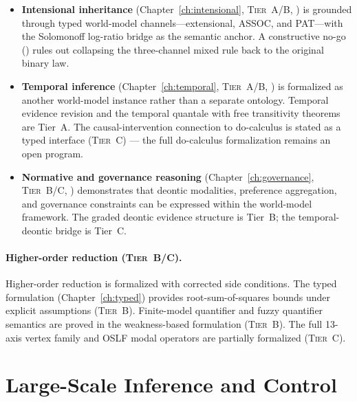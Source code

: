 \begin{itemize}
\item \textbf{Intensional inheritance}
  (Chapter~\ref{ch:intensional}, \textsc{Tier~A/B},
  \claimConditional{}) is grounded through typed
  world-model channels---extensional, ASSOC, and PAT---with the
  Solomonoff log-ratio bridge as the semantic anchor.  A constructive
  no-go (\claimBoundary{}) rules out collapsing the three-channel mixed
  rule back to the original binary law.

\item \textbf{Temporal inference}
  (Chapter~\ref{ch:temporal}, \textsc{Tier~A/B},
  \claimConditional{}) is formalized as another world-model instance
  rather than a separate ontology.  Temporal evidence revision and the
  temporal quantale with free transitivity theorems are Tier~A.  The
  causal-intervention connection to do-calculus is stated as a
  typed interface (\textsc{Tier~C}) --- the full do-calculus
  formalization remains an open program.

\item \textbf{Normative and governance reasoning}
  (Chapter~\ref{ch:governance}, \textsc{Tier~B/C},
  \claimConditional{}) demonstrates that deontic modalities,
  preference aggregation, and governance constraints can be expressed
  within the world-model framework.  The graded deontic evidence
  structure is Tier~B; the temporal-deontic bridge is Tier~C.
\end{itemize}

\paragraph{Higher-order reduction (\textsc{Tier~B/C}).}
Higher-order reduction is formalized with corrected side conditions.
The typed formulation (Chapter~\ref{ch:typed}) provides
root-sum-of-squares bounds under explicit assumptions (\textsc{Tier~B}).
Finite-model quantifier and fuzzy quantifier semantics are proved in the
weakness-based formulation (\textsc{Tier~B}).  The full 13-axis vertex
family and OSLF modal operators are partially formalized
(\textsc{Tier~C}).


\section{Large-Scale Inference and Control}
\label{sec:covers-scale}

